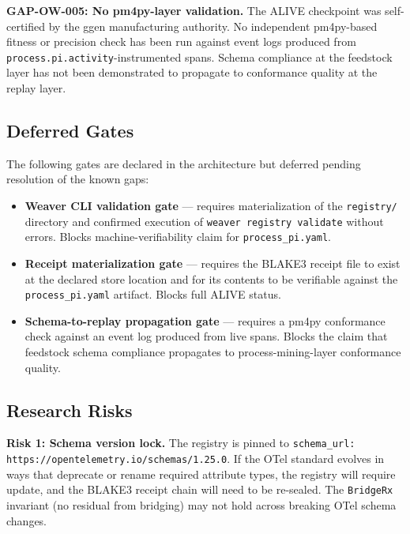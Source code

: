 \textbf{GAP-OW-005: No pm4py-layer validation.}
The ALIVE checkpoint was self-certified by the ggen manufacturing authority. No independent
pm4py-based fitness or precision check has been run against event logs produced from
\texttt{process.pi.activity}-instrumented spans. Schema compliance at the feedstock layer
has not been demonstrated to propagate to conformance quality at the replay layer.

\subsection{Deferred Gates}
\label{sec:otel-weaver-exp-001-custom-pi-registry-questions-deferred}

The following gates are declared in the architecture but deferred pending resolution of the
known gaps:

\begin{itemize}
  \item \textbf{Weaver CLI validation gate} --- requires materialization of the
        \texttt{registry/} directory and confirmed execution of \texttt{weaver registry validate}
        without errors. Blocks machine-verifiability claim for \texttt{process\_pi.yaml}.
  \item \textbf{Receipt materialization gate} --- requires the BLAKE3 receipt file to exist at
        the declared store location and for its contents to be verifiable against the
        \texttt{process\_pi.yaml} artifact. Blocks full ALIVE status.
  \item \textbf{Schema-to-replay propagation gate} --- requires a pm4py conformance check
        against an event log produced from live spans. Blocks the claim that feedstock schema
        compliance propagates to process-mining-layer conformance quality.
\end{itemize}

\subsection{Research Risks}
\label{sec:otel-weaver-exp-001-custom-pi-registry-questions-risks}

\textbf{Risk 1: Schema version lock.}
The registry is pinned to \texttt{schema\_url: https://opentelemetry.io/schemas/1.25.0}. If the
OTel standard evolves in ways that deprecate or rename required attribute types, the registry
will require update, and the BLAKE3 receipt chain will need to be re-sealed. The \texttt{BridgeRx}
invariant (no residual from bridging) may not hold across breaking OTel schema changes.

